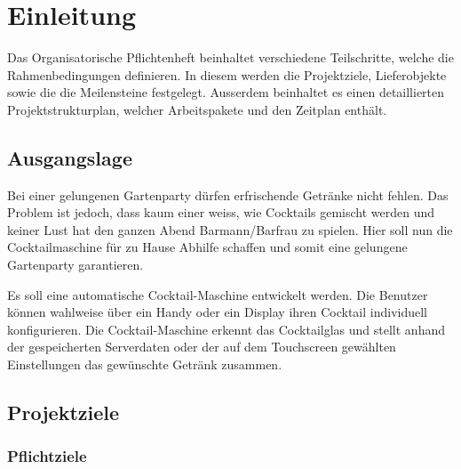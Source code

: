\clearpage
\section{Einleitung}\label{sec:Einleitung}
Das Organisatorische Pflichtenheft beinhaltet verschiedene Teilschritte, welche die Rahmenbedingungen definieren. In diesem werden die Projektziele, Lieferobjekte sowie die die Meilensteine festgelegt. Ausserdem beinhaltet es einen detaillierten Projektstrukturplan, welcher Arbeitspakete und den Zeitplan enthält.

\subsection{Ausgangslage}\label{subsec:Ausgangslage}

Bei einer gelungenen Gartenparty dürfen erfrischende Getränke nicht fehlen. Das Problem ist jedoch, dass kaum einer weiss, wie Cocktails gemischt werden und keiner Lust hat den ganzen Abend Barmann/Barfrau zu spielen. Hier soll nun die Cocktailmaschine für zu Hause Abhilfe schaffen und somit eine gelungene Gartenparty garantieren.

Es soll eine automatische Cocktail-Maschine entwickelt werden. Die Benutzer können wahlweise über ein Handy oder ein Display ihren Cocktail individuell konfigurieren. Die Cocktail-Maschine erkennt das Cocktailglas und stellt anhand der gespeicherten Serverdaten oder der auf dem Touchscreen gewählten Einstellungen das gewünschte Getränk zusammen. 
 
\newpage
\subsection{Projektziele}\label{subsec:Projektziele}

\subsubsection{Pflichtziele}\label{sec:Pflichtziele}

